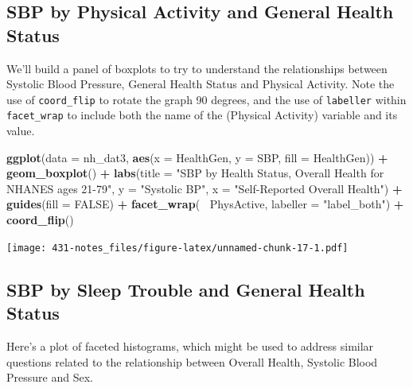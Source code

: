 \documentclass[
]{book}
\newenvironment{Shaded}{\begin{snugshade}}{\end{snugshade}}
\newcommand{\DataTypeTok}[1]{\textcolor[rgb]{0.13,0.29,0.53}{#1}}
\newcommand{\KeywordTok}[1]{\textcolor[rgb]{0.13,0.29,0.53}{\textbf{#1}}}
\newcommand{\NormalTok}[1]{#1}
\newcommand{\OperatorTok}[1]{\textcolor[rgb]{0.81,0.36,0.00}{\textbf{#1}}}
\newcommand{\OtherTok}[1]{\textcolor[rgb]{0.56,0.35,0.01}{#1}}
\newcommand{\StringTok}[1]{\textcolor[rgb]{0.31,0.60,0.02}{#1}}
\begin{document}
\hypertarget{sbp-by-physical-activity-and-general-health-status}{%
\subsection{SBP by Physical Activity and General Health Status}\label{sbp-by-physical-activity-and-general-health-status}}

We'll build a panel of boxplots to try to understand the relationships between Systolic Blood Pressure, General Health Status and Physical Activity. Note the use of \texttt{coord\_flip} to rotate the graph 90 degrees, and the use of \texttt{labeller} within \texttt{facet\_wrap} to include both the name of the (Physical Activity) variable and its value.

\begin{Shaded}
\begin{Highlighting}[]
\KeywordTok{ggplot}\NormalTok{(}\DataTypeTok{data =}\NormalTok{ nh_dat3, }\KeywordTok{aes}\NormalTok{(}\DataTypeTok{x =}\NormalTok{ HealthGen, }\DataTypeTok{y =}\NormalTok{ SBP, }\DataTypeTok{fill =}\NormalTok{ HealthGen)) }\OperatorTok{+}\StringTok{ }
\StringTok{    }\KeywordTok{geom_boxplot}\NormalTok{() }\OperatorTok{+}\StringTok{ }
\StringTok{    }\KeywordTok{labs}\NormalTok{(}\DataTypeTok{title =} \StringTok{"SBP by Health Status, Overall Health for NHANES ages 21-79"}\NormalTok{,}
         \DataTypeTok{y =} \StringTok{"Systolic BP"}\NormalTok{, }\DataTypeTok{x =} \StringTok{"Self-Reported Overall Health"}\NormalTok{) }\OperatorTok{+}\StringTok{ }
\StringTok{    }\KeywordTok{guides}\NormalTok{(}\DataTypeTok{fill =} \OtherTok{FALSE}\NormalTok{) }\OperatorTok{+}
\StringTok{    }\KeywordTok{facet_wrap}\NormalTok{(}\OperatorTok{~}\StringTok{ }\NormalTok{PhysActive, }\DataTypeTok{labeller =} \StringTok{"label_both"}\NormalTok{) }\OperatorTok{+}\StringTok{ }
\StringTok{    }\KeywordTok{coord_flip}\NormalTok{()}
\end{Highlighting}
\end{Shaded}

\texttt{[image: 431-notes\_files/figure-latex/unnamed-chunk-17-1.pdf]}

\hypertarget{sbp-by-sleep-trouble-and-general-health-status}{%
\subsection{SBP by Sleep Trouble and General Health Status}\label{sbp-by-sleep-trouble-and-general-health-status}}

Here's a plot of faceted histograms, which might be used to address similar questions related to the relationship between Overall Health, Systolic Blood Pressure and Sex.
\end{document}
